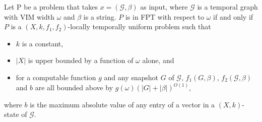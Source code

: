 \documentclass[a4paper,UKenglish,cleveref, autoref, thm-restate]{lipics-v2021} %
\begin{document}



\begin{theoremrep}\label{thm:VIM-iff}
    Let P be a problem that takes $x=(\mathcal{G},\beta)$ as input, where $\mathcal{G}$ is a temporal graph with VIM width $\omega$ and $\beta$ is a string. $P$ is in FPT with respect to $\omega$ if and only if $P$ is a $(X,k,f_1,f_2)$-locally temporally uniform problem such that 
      \begin{itemize}
         \item $k$ is a constant, 
          \item $|X|$ is upper bounded by a function of $\omega$ alone, and
          \item for a computable function $g$ and any snapshot $G$ of $\mathcal{G}$, $f_1(G,\beta)$, $f_2(\mathcal{G},\beta)$ and $b$ are all bounded above by $g(\omega)(|G| + |\beta|)^{O(1)}$,
     \end{itemize}
    where $b$ is the maximum absolute value of any entry of a vector in a $(X,k)$-state of $\mathcal{G}$.
\end{theoremrep}
\end{document}
